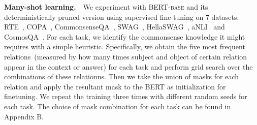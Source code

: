 \textbf{Many-shot learning.}~~We experiment with \textsc{BERT-base} and its deterministically pruned version using supervised fine-tuning on $7$ datasets: RTE~\citep{CambridgeJournals:6906264}, COPA~\citep{roemmele_choice_2011}, CommonsenseQA~\citep{talmor-etal-2019-commonsenseqa}, SWAG~\citep{zellers-etal-2018-swag}, HellaSWAG~\citep{DBLP:journals/corr/abs-1905-07830},   aNLI~\citep{DBLP:journals/corr/abs-1908-05739} and CosmosQA~\citep{huang-etal-2019-cosmos}. For each task, we identify the commonsense knowledge it might requires with a simple heuristic. Specifically, we obtain the five most frequent relations~(measured by how many times subject and object of certain relation appear in the context or answer) for each task and perform grid search over the combinations of these relationns. Then we take the union of masks for each relation and apply the resultant mask to the BERT as initialization for finetuning.
We repeat the training three times with different random seeds for each task. 
The  choice of mask combination for each task can be found in Appendix B.


